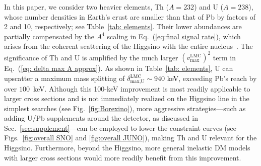 \documentclass[aps,prd,amsmath,amssymb,10pt,letterpaper,balancelastpage,showpacs,superscriptaddress,nofootinbib,floatfix,notitlepage,longbibliography,twocolumn
]{revtex4-2}
\newcommand{\numcolor}[1]{\textcolor{black}{#1}}
\newcommand{\Eq}[1]{Eq.~(#1)}
\newcommand{\vmaxLMC}{v^{\text{LMC}}_{\text{max}}}
\newcommand{\deltamaxLMC}[1]{\delta^{\text{LMC}}_{\text{max},\text{#1}}}
\begin{document}
In this paper, we consider two heavier elements, Th ($A=232$) and U ($A=238$), whose number densities in Earth's crust are smaller than that of Pb by factors of 2 and 10, respectively; see Table~\ref{tab: elements}. Their lower abundances are partially compensated by the $A^4$ scaling in \Eq{\ref{eq:final signal rate}}, which arises from the coherent scattering of the Higgsino with the entire nucleus~\cite{Barn}. The significance of Th and U is amplified by the much larger $(\vmaxLMC)^2$ term in \Eq{\ref{eq: delta max A approx}}. As shown in Table~\ref{tab: elements}, U can upscatter a maximum mass splitting of \numcolor{$\deltamaxLMC{U} \sim 940$ keV}, exceeding Pb's reach by over $100$~keV. Although this 100-keV improvement is most readily applicable to larger cross sections and is not immediately realized on the Higgsino line in the simplest searches (see Fig.~\ref{fig:Borexino}), more aggressive strategies---such as adding U/Pb supplements around the detector, as discussed in Sec.~\ref{sec:supplement}---can be employed to lower the constraint curves (see Figs.~\ref{fig:overall SNO} and \ref{fig:overall JUNO}), making Th and U relevant for the Higgsino. Furthermore, beyond the Higgsino, more general inelastic DM models with larger cross sections would more readily benefit from this improvement.
\end{document}
